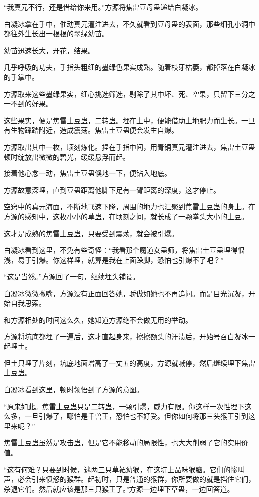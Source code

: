 \begin{this_body}
“我真元不行，还是借给你来用。”方源将焦雷豆母蛊递给白凝冰。

白凝冰拿在手中，催动真元灌注进去，不久就看到豆母蛊的表面，那些细孔小洞中都往外生长出一根根的翠绿幼苗。

幼苗迅速长大，开花，结果。

几乎呼吸的功夫，手指头粗细的墨绿色果实成熟。随着枝牙枯萎，都掉落在白凝冰的手掌中。

方源取来这些墨绿果实，细心挑选筛选，剔除了其中坏、死、空果，只留下三分之一不到的好果。

这些果实，便是焦雷土豆蛊，二转蛊。埋在土中，便能借助土地肥力而生长。一旦有生物踩踏附近，造成震荡。焦雷土豆蛊便会发生自爆。

方源取出其中一枚，顷刻炼化。捏在手指中间，用青铜真元灌注进去，焦雷土豆蛊顿时绽放出微微的碧光，缓缓悬浮而起。

接着他心念一动，焦雷土豆蛊倏地一下，便钻入地底。

方源故意深埋，直到豆蛊距离他脚下足有一臂距离的深度，这才停止。

空窍中的真元海面，不断地飞速下降，周围的地力也汇聚到焦雷土豆蛊的身上。在方源的感知中，这枚小小的草蛊，在顷刻之间，就长成了一颗拳头大小的土豆。

这才是成熟的焦雷土豆蛊，只要受到震荡，就会被引爆。

白凝冰看到这里，不免有些奇怪：“我看那个魔道女蛊师，将焦雷土豆蛊埋得很浅，易于引爆。你这样埋，就算是我在上面跺脚，恐怕也引爆不了吧？”

“这是当然。”方源回了一句，继续埋头铺设。

白凝冰微微撇嘴，方源没有正面回答她，骄傲如她也不再追问。而是目光沉凝，开始自我思索。

和方源相处的时间这么久，她知道方源绝不会做无用的举动。

方源将坑底都埋了一遍后，这才直起身来，擦擦额头的汗渍后，开始号召白凝冰一起埋土。

但土只埋了片刻，坑底地面增高了一丈五的高度，方源就喊停，然后继续埋下焦雷土豆蛊。

白凝冰看到这里，顿时领悟到了方源的意图。

“原来如此。焦雷土豆蛊只是二转蛊，一颗引爆，威力有限。你这样一次性埋下这么多，一旦引爆了，哪怕是千兽王，恐怕也不好受。但你如何将那三头猴王引到这里来呢？”

焦雷土豆蛊虽然是攻击蛊，但是它不能移动的局限性，也大大削弱了它的实用价值。

“这有何难？只要到时候，逮两三只草裙幼猴，在这坑上品味猴脑。它们的惨叫声，必会引来愤怒的猴群。起初时，只是普通的猴群，你所要做的就是挡住它们，杀退它们。然后就应该是那三只猴王了。”方源一边埋下草蛊，一边回答道。


\end{this_body}
